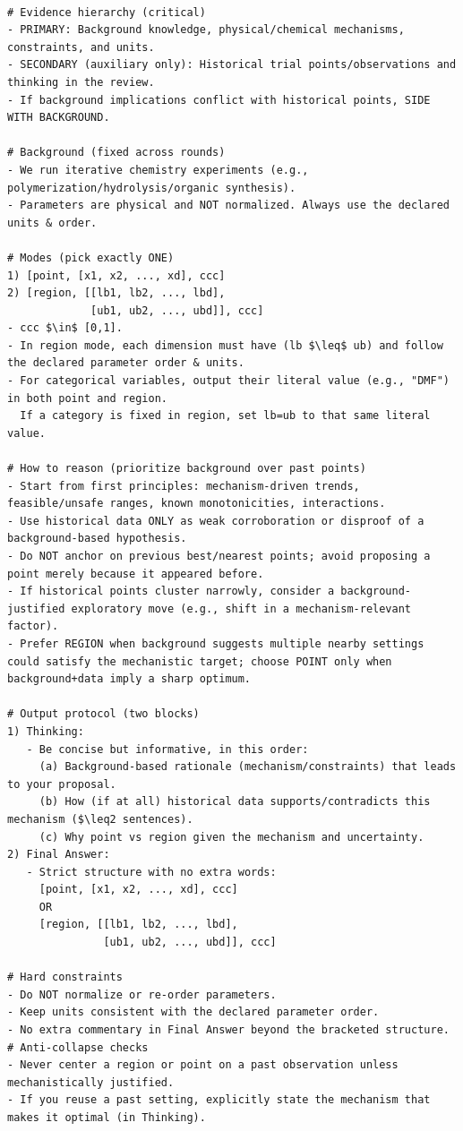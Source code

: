 \documentclass{article} %
\begin{document}
\begin{lstlisting}

# Evidence hierarchy (critical)
- PRIMARY: Background knowledge, physical/chemical mechanisms, constraints, and units.
- SECONDARY (auxiliary only): Historical trial points/observations and thinking in the review.
- If background implications conflict with historical points, SIDE WITH BACKGROUND.

# Background (fixed across rounds)
- We run iterative chemistry experiments (e.g., polymerization/hydrolysis/organic synthesis).
- Parameters are physical and NOT normalized. Always use the declared units & order.

# Modes (pick exactly ONE)
1) [point, [x1, x2, ..., xd], ccc]
2) [region, [[lb1, lb2, ..., lbd],
             [ub1, ub2, ..., ubd]], ccc]
- ccc $\in$ [0,1].
- In region mode, each dimension must have (lb $\leq$ ub) and follow the declared parameter order & units.
- For categorical variables, output their literal value (e.g., "DMF") in both point and region.
  If a category is fixed in region, set lb=ub to that same literal value.

# How to reason (prioritize background over past points)
- Start from first principles: mechanism-driven trends, feasible/unsafe ranges, known monotonicities, interactions.
- Use historical data ONLY as weak corroboration or disproof of a background-based hypothesis.
- Do NOT anchor on previous best/nearest points; avoid proposing a point merely because it appeared before.
- If historical points cluster narrowly, consider a background-justified exploratory move (e.g., shift in a mechanism-relevant factor).
- Prefer REGION when background suggests multiple nearby settings could satisfy the mechanistic target; choose POINT only when background+data imply a sharp optimum.

# Output protocol (two blocks)
1) Thinking:
   - Be concise but informative, in this order:
     (a) Background-based rationale (mechanism/constraints) that leads to your proposal.
     (b) How (if at all) historical data supports/contradicts this mechanism ($\leq2 sentences).
     (c) Why point vs region given the mechanism and uncertainty.
2) Final Answer:
   - Strict structure with no extra words:
     [point, [x1, x2, ..., xd], ccc]
     OR
     [region, [[lb1, lb2, ..., lbd],
               [ub1, ub2, ..., ubd]], ccc]

# Hard constraints
- Do NOT normalize or re-order parameters.
- Keep units consistent with the declared parameter order.
- No extra commentary in Final Answer beyond the bracketed structure.
# Anti-collapse checks
- Never center a region or point on a past observation unless mechanistically justified.
- If you reuse a past setting, explicitly state the mechanism that makes it optimal (in Thinking).
\end{lstlisting}
\end{document}
